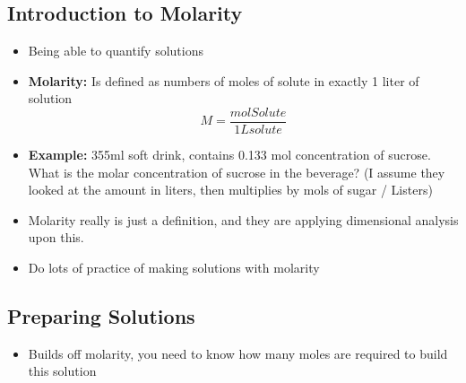 \documentclass{article}
\begin{document}
\subsection{Introduction to Molarity}
\begin{itemize}
  \item Being able to quantify solutions
  \item \textbf{Molarity:} Is defined as numbers of moles of solute in exactly 1 liter of solution
    $$ M = \frac{mol Solute}{1L solute} $$
  \item \textbf{Example:} 355ml soft drink, contains 0.133 mol concentration of sucrose.
    What is the molar concentration of sucrose in the beverage?
    (I assume they looked at the amount in liters, then multiplies by mols of sugar / Listers)
  \item Molarity really is just a definition, and they are applying dimensional analysis upon this.
  \item Do lots of practice of making solutions with molarity
\end{itemize}

\subsection{Preparing Solutions}
\begin{itemize}
  \item Builds off molarity, you need to know
    how many moles are required to build this solution
\end{itemize}
\end{document}
